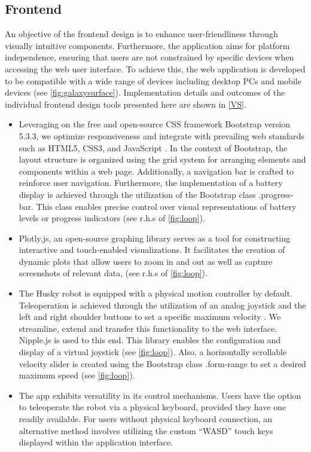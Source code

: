 \documentclass[conference]{IEEEtran}
\begin{document}
\subsection{Frontend}
An objective of the frontend design is to enhance user-friendliness through visually intuitive components. Furthermore, the application aims for platform independence, ensuring that users are not constrained by specific devices when accessing the web user interface. 
To achieve this, the web application is developed to be compatible with a wide range of devices including desktop PCs and mobile devices (see \cref{fig:galaxysurface}). Implementation details and outcomes of the individual frontend design tools presented here are shown in \ref{VS}.
\begin{itemize}
\item Leveraging on the free and open-source CSS framework Bootstrap version 5.3.3, we optimize responsiveness and integrate with prevailing web standards such as HTML5, CSS3, and JavaScript \cite{bootstrap}. 
In the context of Bootstrap, the layout structure is organized using the grid system for arranging elements and components within a web page. 
Additionally, a navigation bar is crafted to reinforce user navigation.
Furthermore, the implementation of a battery display is achieved through the utilization of the Bootstrap class .progress-bar. 
This class enables precise control over visual representations of battery levels or  progress indicators (see r.h.s of \cref{fig:loop}).
\item Plotly.js, an open-source graphing library serves as a tool for constructing interactive and touch-enabled visualizations. It facilitates the creation of dynamic plots that allow users to zoom in and out as well as capture screenshots of relevant data, \cite{plotly} (see r.h.s of \cref{fig:loop}). 
\item The Husky robot is equipped with a physical motion controller by default. Teleoperation is achieved through the utilization of an analog joystick and the left and right shoulder buttons to set a specific maximum velocity \cite{huskydriving}.
We streamline, extend and transfer this functionality to the web interface. Nipple.js is used to this end. This library enables the configuration and display of a virtual joystick \cite{nipplejs} (see \cref{fig:loop}). Also, a horizontally scrollable velocity slider is created using the Bootstrap class .form-range to set a desired maximum speed (see \cref{fig:loop}).
\item The app exhibits versatility in its control mechanisms. Users have the option to teleoperate the robot via a physical keyboard, provided they have one readily available. For users without  physical keyboard connection, an alternative method involves utilizing the custom “WASD” touch keys displayed within the application interface. 

\end{itemize}
\end{document}
